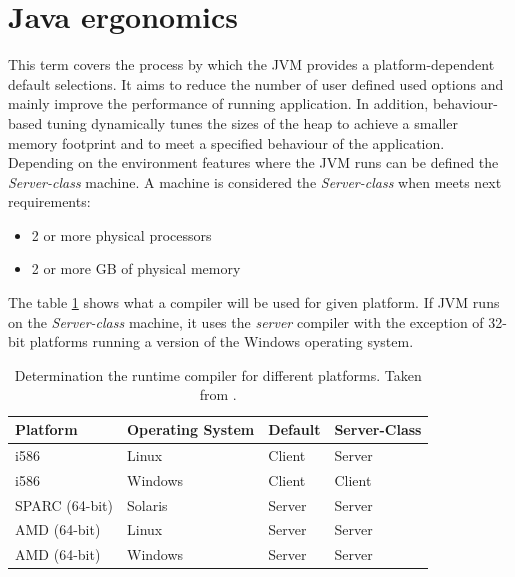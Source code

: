 \documentclass[
  digital, %
  oneside,
  notable, %
  nolof,     %
  nolot     %
]{fithesis3}
\begin{document}
\section{Java ergonomics}\label{secerg}
This term covers the process by which the JVM provides a platform-dependent default selections. It aims to reduce the number of user defined used options and mainly improve the performance of running application. In addition, behaviour-based tuning dynamically tunes the sizes of the heap to achieve a smaller memory footprint and to meet a specified behaviour of the application. Depending on the environment features where the JVM runs can be defined the \textit{Server-class} machine. A machine is considered the \textit{Server-class} when meets next requirements:
\begin{itemize}
	\item 2 or more physical processors
	\item 2 or more GB of physical memory
\end{itemize}
The table \ref{figerg} shows what a compiler will be used for given platform. If JVM runs on the \textit{Server-class} machine, it uses the \textit{server} compiler with the exception of 32-bit platforms running a version of the Windows operating system.

\begin{table}[]
	\centering
	\begin{tabular}{|l|l|l|l|}
		\hline
		\textbf{Platform} & \textbf{Operating System} & \textbf{Default} & \textbf{Server-Class} \\ \hline
		i586              & Linux                     & Client           & Server                           \\ \hline
		i586              & Windows                   & Client           & Client                           \\ \hline
		SPARC (64-bit)    & Solaris                   & Server           & Server                           \\ \hline
		AMD (64-bit)      & Linux                     & Server           & Server                           \\ \hline
		AMD (64-bit)      & Windows                   & Server           & Server                           \\ \hline
	\end{tabular}
	\caption{Determination the runtime compiler for different platforms. Taken from \cite{ergonomics}.}
	\label{figerg}
\end{table}
\end{document}
